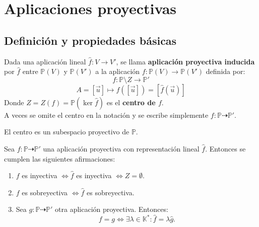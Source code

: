 \section{Aplicaciones proyectivas}
\subsection{Definición y propiedades básicas}

\begin{definición}
    Dada una aplicación lineal $\hat{f}:V \to V'$, se llama \textbf{aplicación proyectiva inducida} por $\hat{f}$ entre $\mathbb{P}(V)$ y $\mathbb{P}(V')$ a la aplicación $f:\mathbb{P}(V) \to \mathbb{P}(V')$ definida por:
    \[
        f : \mathbb{P} \setminus Z \to \mathbb{P}' 
    \]
    \[
        A = [\vec{u}] \mapsto f([\vec{u}]) = [\hat{f}(\vec{u})]
    \]
    Donde $Z = Z(f) = \mathbb{P}(\ker \hat{f})$ es el \textbf{centro de $f$}.\\
    A veces se omite el centro en la notación y se escribe simplemente $f:\mathbb{P} \dashrightarrow \mathbb{P}'$.
\end{definición}

\begin{observación}
    El centro es un subespacio proyectivo de $\mathbb{P}$.
\end{observación}

\begin{proposición}
    Sea $f:\mathbb{P} \dashrightarrow \mathbb{P}'$ una aplicación proyectiva con representación lineal $\hat{f}$. Entonces se cumplen las siguientes afirmaciones:
    
    \begin{enumerate}
        \item $f$ es inyectiva $\iff \hat{f}$ es inyectiva $\iff Z = \emptyset$.
        \item $f$ es sobreyectiva $\iff \hat{f}$ es sobreyectiva.
        \item Sea $g:\mathbb{P} \dashrightarrow \mathbb{P}'$ otra aplicación proyectiva. Entonces:
        \[
            f = g \iff \exists \lambda \in \mathbb{K}^* : \hat{f} = \lambda \hat{g}.
        \]
    \end{enumerate}
\end{proposición}
    

